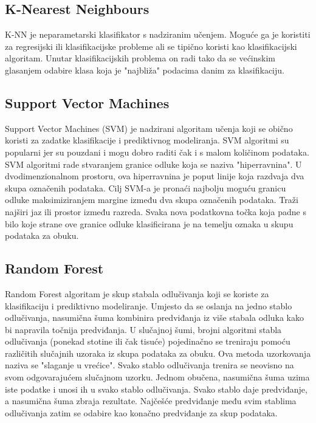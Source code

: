 \documentclass[]{foi}
\begin{document}
\subsection{K-Nearest Neighbours}
K-NN je neparametarski klasifikator s nadziranim učenjem. Moguće ga je koristiti za regresijski ili klasifikacijske probleme ali se tipično koristi kao klasifikacijski algoritam. Unutar klasifikacijskih problema on radi tako da se većinskim glasanjem odabire klasa koja je "najbliža" podacima danim za klasifikaciju. \cite{k-nearest}

\subsection{Support Vector Machines}
Support Vector Machines (SVM) je nadzirani algoritam učenja koji se obično koristi za zadatke klasifikacije i prediktivnog modeliranja. SVM algoritmi su popularni jer su pouzdani i mogu dobro raditi čak i s malom količinom podataka. SVM algoritmi rade stvaranjem granice odluke koja se naziva "hiperravnina". U dvodimenzionalnom prostoru, ova hiperravnina je poput linije koja razdvaja dva skupa označenih podataka. 
Cilj SVM-a je pronaći najbolju moguću granicu odluke maksimiziranjem margine između dva skupa označenih podataka. Traži najširi jaz ili prostor između razreda. Svaka nova podatkovna točka koja padne s bilo koje strane ove granice odluke klasificirana je na temelju oznaka u skupu podataka za obuku. \cite{Coursera2024}

\subsection{Random Forest}
Random Forest algoritam je skup stabala odlučivanja koji se koriste za klasifikaciju i prediktivno modeliranje. Umjesto da se oslanja na jedno stablo odlučivanja, nasumična šuma kombinira predviđanja iz više stabala odluka kako bi napravila točnija predviđanja. U slučajnoj šumi, brojni algoritmi stabla odlučivanja (ponekad stotine ili čak tisuće) pojedinačno se treniraju pomoću različitih slučajnih uzoraka iz skupa podataka za obuku. Ova metoda uzorkovanja naziva se "slaganje u vrećice". Svako stablo odlučivanja trenira se neovisno na svom odgovarajućem slučajnom uzorku. 
Jednom obučena, nasumična šuma uzima iste podatke i unosi ih u svako stablo odlučivanja. Svako stablo daje predviđanje, a nasumična šuma zbraja rezultate. Najčešće predviđanje među svim stablima odlučivanja zatim se odabire kao konačno predviđanje za skup podataka. \cite{Coursera2024}
\end{document}
